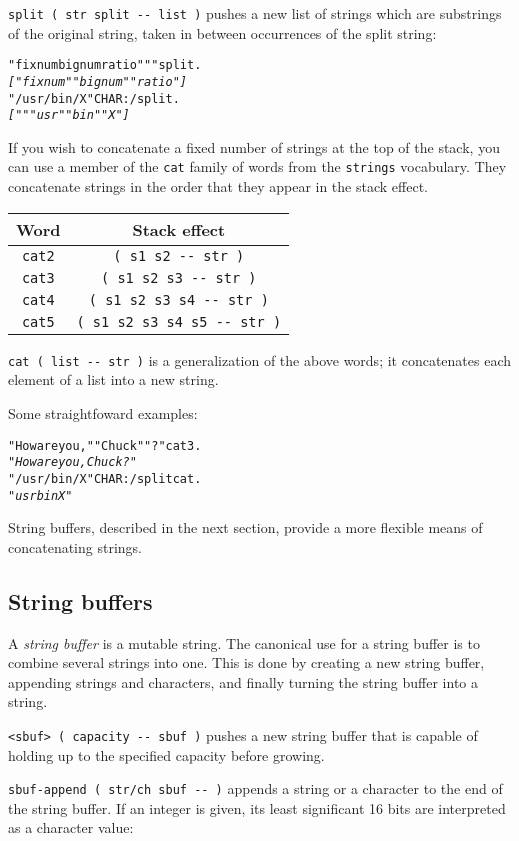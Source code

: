 \documentclass[english]{article}
\providecommand{\tabularnewline}{\\}
\begin{document}
\texttt{split ( str split -{}- list )} pushes a new list of strings
which are substrings of the original string, taken in between occurrences
of the split string:

\begin{alltt}
"fixnum bignum ratio" " " split .
\emph{{[} "fixnum" "bignum" "ratio" {]}}
"/usr/bin/X" CHAR: / split .
\emph{{[} "" "usr" "bin" "X" {]}}
\end{alltt}
If you wish to concatenate a fixed number of strings at the top of
the stack, you can use a member of the \texttt{cat} family of words
from the \texttt{strings} vocabulary. They concatenate strings in
the order that they appear in the stack effect.

\begin{tabular}{|c|c|}
\hline 
Word&
Stack effect\tabularnewline
\hline
\hline 
\texttt{cat2}&
\texttt{( s1 s2 -{}- str )}\tabularnewline
\hline 
\texttt{cat3}&
\texttt{( s1 s2 s3 -{}- str )}\tabularnewline
\hline 
\texttt{cat4}&
\texttt{( s1 s2 s3 s4 -{}- str )}\tabularnewline
\hline 
\texttt{cat5}&
\texttt{( s1 s2 s3 s4 s5 -{}- str )}\tabularnewline
\hline
\end{tabular}

\texttt{cat ( list -{}- str )} is a generalization of the above words;
it concatenates each element of a list into a new string.

Some straightfoward examples:

\begin{alltt}
"How are you, " "Chuck" "?" cat3 .
\emph{"How are you, Chuck?"}
"/usr/bin/X" CHAR: / split cat .
\emph{"usrbinX"}
\end{alltt}
String buffers, described in the next section, provide a more flexible
means of concatenating strings.


\subsection{String buffers}

A \emph{string buffer} is a mutable string. The canonical use for
a string buffer is to combine several strings into one. This is done
by creating a new string buffer, appending strings and characters,
and finally turning the string buffer into a string.

\texttt{<sbuf> ( capacity -{}- sbuf )} pushes a new string buffer
that is capable of holding up to the specified capacity before growing.

\texttt{sbuf-append ( str/ch sbuf -{}- )} appends a string or a character
to the end of the string buffer. If an integer is given, its least significant
16 bits are interpreted as a character value:
\end{document}
